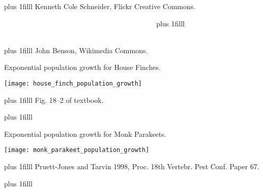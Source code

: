 \documentclass[t]{beamer}
\newcommand\imagecredit[1]{%
	\vskip0pt plus 1filll \tiny #1}%
\begin{document}
{
\begin{frame}[t,plain]{}
\imagecredit{Kenneth Cole Schneider, Flickr Creative Commons.}
\end{frame}
}

{
\begin{frame}[t,plain]{\textcolor{white}{What are the two models of population growth?}}
\imagecredit{\hfill\textcolor{white}{Photographer unknown, Wikimedia Commons.}}
\end{frame}
}

{
\begin{frame}[t,plain]{}
\imagecredit{\hfill John Benson, Wikimedia Commons.}
\end{frame}
}

\begin{frame}[t,plain]{Exponential population growth for House Finches.}
	\begin{center}
		\texttt{[image: house\_finch\_population\_growth]}
	\end{center}	

	\imagecredit{\hfill Fig. 18--2 of textbook.}
\end{frame}


{
\begin{frame}[t,plain]{}
\imagecredit{\textcolor{white}{John W. Iwanski, Flickr Creative Commons.}}
\end{frame}
}

\begin{frame}[t,plain]{Exponential population growth for Monk Parakeets.}
	\begin{center}
		\texttt{[image: monk\_parakeet\_population\_growth]}
	\end{center}	

	\imagecredit{\hfill Pruett-Jones and Tarvin 1998, Proc. 18th Vertebr. Pest Conf. Paper 67.}
\end{frame}

{
\begin{frame}[t,plain]{}
\imagecredit{\textcolor{white}{Changhua Coast Conservation Action, Flickr Creative Commons.}}
\end{frame}
}
\end{document}
